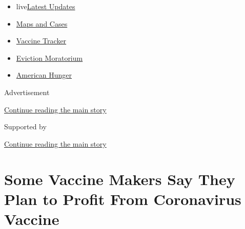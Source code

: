 \begin{itemize}
\tightlist
\item
  live\href{https://www.nytimes3xbfgragh.onion/2020/09/05/world/coronavirus-covid.html?name=styln-coronavirus-national\&region=TOP_BANNER\&block=storyline_menu_recirc\&action=click\&pgtype=Article\&impression_id=dadfff90-efba-11ea-b84b-3bf7ccc2e294\&variant=undefined}{Latest
  Updates}
\item
  \href{https://www.nytimes3xbfgragh.onion/interactive/2020/us/coronavirus-us-cases.html?name=styln-coronavirus-national\&region=TOP_BANNER\&block=storyline_menu_recirc\&action=click\&pgtype=Article\&impression_id=dadfff91-efba-11ea-b84b-3bf7ccc2e294\&variant=undefined}{Maps
  and Cases}
\item
  \href{https://www.nytimes3xbfgragh.onion/interactive/2020/science/coronavirus-vaccine-tracker.html?name=styln-coronavirus-national\&region=TOP_BANNER\&block=storyline_menu_recirc\&action=click\&pgtype=Article\&impression_id=dadfff92-efba-11ea-b84b-3bf7ccc2e294\&variant=undefined}{Vaccine
  Tracker}
\item
  \href{https://www.nytimes3xbfgragh.onion/2020/09/02/your-money/eviction-moratorium-covid.html?name=styln-coronavirus-national\&region=TOP_BANNER\&block=storyline_menu_recirc\&action=click\&pgtype=Article\&impression_id=dadfff93-efba-11ea-b84b-3bf7ccc2e294\&variant=undefined}{Eviction
  Moratorium}
\item
  \href{https://www.nytimes3xbfgragh.onion/interactive/2020/09/02/magazine/food-insecurity-hunger-us.html?name=styln-coronavirus-national\&region=TOP_BANNER\&block=storyline_menu_recirc\&action=click\&pgtype=Article\&impression_id=dadfff94-efba-11ea-b84b-3bf7ccc2e294\&variant=undefined}{American
  Hunger}
\end{itemize}

Advertisement

\protect\hyperlink{after-top}{Continue reading the main story}

Supported by

\protect\hyperlink{after-sponsor}{Continue reading the main story}

\hypertarget{some-vaccine-makers-say-they-plan-to-profit-from-coronavirus-vaccine}{%
\section{Some Vaccine Makers Say They Plan to Profit From Coronavirus
Vaccine}\label{some-vaccine-makers-say-they-plan-to-profit-from-coronavirus-vaccine}}

